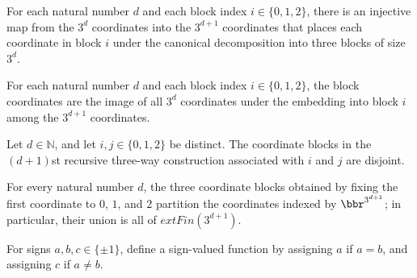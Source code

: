 \begin{definition}
\label{FABL.recursiveMajorityThreeBlockEmbedding}
\leanok
For each natural number $d$ and each block index $i\in\{0,1,2\}$, there is an injective
map from the $3^d$ coordinates into the $3^{d+1}$ coordinates that places each
coordinate in block $i$ under the canonical decomposition into three blocks of size
$3^d$.
\end{definition}

\begin{definition}
\label{FABL.recursiveMajorityThreeBlockCoordinates}
\leanok
{}
For each natural number $d$ and each block index $i\in\{0,1,2\}$, the block coordinates
are the image of all $3^d$ coordinates under the embedding into block $i$ among the
$3^{d+1}$ coordinates.
\end{definition}

\begin{theorem}
\label{FABL.recursiveMajorityThreeBlockCoordinates_disjoint}
\leanok
{}
Let $d\in\mathbb{N}$, and let $i,j\in\{0,1,2\}$ be distinct. The coordinate blocks in
the $(d+1)$st recursive three-way construction associated with $i$ and $j$ are disjoint.
\end{theorem}

\begin{theorem}
\label{FABL.recursiveMajorityThreeBlockCoordinates_union}
\leanok
{}
For every natural number $d$, the three coordinate blocks obtained by fixing the first
coordinate to $0$, $1$, and $2$ partition the coordinates indexed by $\bbr^{3^{d+1}}$; in
particular, their union is all of $	ext{Fin}(3^{d+1})$.
\end{theorem}

\begin{definition}
\label{FABL.majorityThreePairValue}
\leanok
{}
For signs $a,b,c\in\{\pm1\}$, define a sign-valued function by assigning $a$ if $a=b$,
and assigning $c$ if $a\ne b$.
\end{definition}

